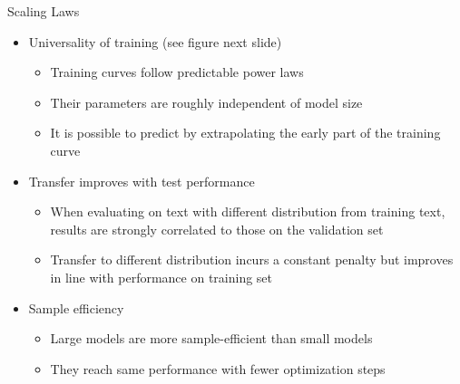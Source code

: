 
\begin{vbframe}{Scaling Laws}

\vfill

\begin{itemize}

	\item Universality of training (see figure next
	slide) \qmark
	\begin{itemize}
	\item Training curves follow predictable power laws
	\item Their parameters are roughly independent of model size
	\item It is possible to predict by extrapolating the early part of the training curve
	\end{itemize}

	\item Transfer improves with test performance \qmark
	\begin{itemize}
	\item When evaluating on text with different distribution from training text, results are strongly correlated to those on the validation set
	\item Transfer to different distribution incurs a constant penalty but improves in line with performance on training set
	\end{itemize}

	\item Sample efficiency \qmark
	\begin{itemize}
	\item Large models are more sample-efficient than small models
	\item They reach same performance with fewer optimization steps
	\end{itemize}

\end{itemize}

\vfill

\end{vbframe}


